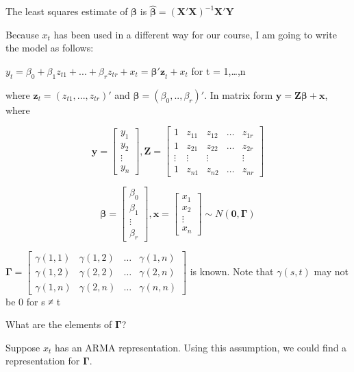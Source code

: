 \documentclass[
]{book}
\theoremstyle{definition}
\theoremstyle{definition}
\theoremstyle{definition}
\theoremstyle{definition}
\theoremstyle{remark}
\begin{document}
The least squares estimate of \(\boldsymbol \beta\) is \(\boldsymbol{\hat \beta} =(\boldsymbol{X'X})^{-1}\boldsymbol{X'Y}\)

Because \(x_t\) has been used in a different way for our course, I am going to write the model as follows:

\(y_t=\beta_0+\beta_1z_{t1}+...+\beta_rz_{tr}+x_t=\boldsymbol{ \beta'z}_t+x_t\) for t = 1,\ldots,n

where \(\boldsymbol z_t=(z_{t1},...,z_{tr})'\) and \(\boldsymbol \beta =(\beta_0,..,\beta_r)'\). In matrix form \(\boldsymbol y=\boldsymbol{Z\beta}+\boldsymbol x\), where

\[\boldsymbol y=\begin{bmatrix} y_1 \\y_2 \\ \vdots \\ y_n\end{bmatrix}, \boldsymbol Z=\begin{bmatrix} 1 & z_{11} & z_{12} & \dots & z_{1r} \\ 1 &  z_{21} & z_{22} & \dots & z_{2r}\\ \vdots & \vdots  & \vdots & & \vdots \\  1 &  z_{n1} & z_{n2} & \dots & z_{nr}  \end{bmatrix}\]

\[\boldsymbol \beta =\begin{bmatrix} \beta_0 \\ \beta_1 \\ \vdots \\ \beta_r \end{bmatrix}, \boldsymbol x =\begin{bmatrix} x_1 \\ x_2 \\ \vdots \\ x_n \end{bmatrix}\sim  N(\boldsymbol 0,\boldsymbol \Gamma)\]

\(\boldsymbol \Gamma=\begin{bmatrix} \gamma(1,1) & \gamma(1,2) & \dots & \gamma(1,n) \\ \gamma(1,2) & \gamma(2,2) & \dots & \gamma(2,n) \\\gamma(1,n) & \gamma(2,n) & \dots & \gamma(n,n) \end{bmatrix}\) is known. Note that \(\gamma(s,t)\) may not be 0 for s ≠ t

What are the elements of \(\boldsymbol \Gamma\)?

Suppose \(x_t\) has an ARMA representation. Using this assumption, we could find a representation for \(\boldsymbol \Gamma\).
\end{document}
